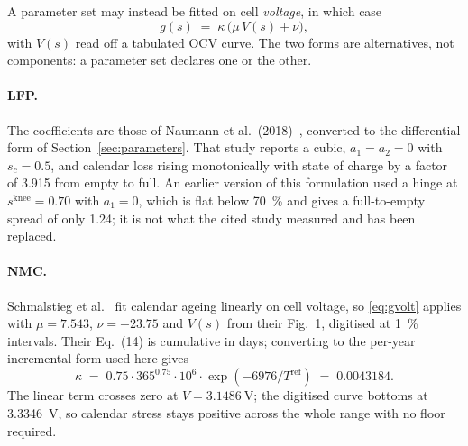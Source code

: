 \documentclass[11pt,a4paper]{article}
\begin{document}
A parameter set may instead be fitted on cell \emph{voltage}, in which
case
%
\begin{equation}
g(s) \;=\; \kappa\,\bigl(\mu\, V(s) + \nu\bigr),
\label{eq:gvolt}
\end{equation}
%
with $V(s)$ read off a tabulated OCV curve. The two forms are
alternatives, not components: a parameter set declares one or the other.

\paragraph{LFP.} The coefficients are those of Naumann et al.\
(2018)~\cite{naumann2018}, converted to the differential form of
Section~\ref{sec:parameters}. That study reports a cubic,
$a_1 = a_2 = 0$ with $s_c = 0.5$, and calendar loss rising
monotonically with state of charge by a factor of \num{3.915} from
empty to full. An earlier version of this formulation used a hinge at
$s^{\mathrm{knee}} = 0.70$ with $a_1 = 0$, which is flat below
\SI{70}{\percent} and gives a full-to-empty spread of only
\num{1.24}; it is not what the cited study measured and has been
replaced.

\paragraph{NMC.} Schmalstieg et al.~\cite{schmalstieg2014} fit calendar
ageing linearly on cell voltage, so \eqref{eq:gvolt} applies with
$\mu = \num{7.543}$, $\nu = \num{-23.75}$ and $V(s)$ from their Fig.~1,
digitised at \SI{1}{\percent} intervals. Their Eq.~(14) is cumulative in
days; converting to the per-year incremental form used here gives
%
\begin{equation}
\kappa \;=\; 0.75 \cdot 365^{0.75} \cdot 10^{6} \cdot
  \exp\!\left(-6976 / T^{\mathrm{ref}}\right) \;=\; \num{0.0043184}.
\label{eq:kappa}
\end{equation}
%
The linear term crosses zero at $V = \SI{3.1486}{\volt}$; the digitised
curve bottoms at \SI{3.3346}{\volt}, so calendar stress stays positive
across the whole range with no floor required.
\end{document}
